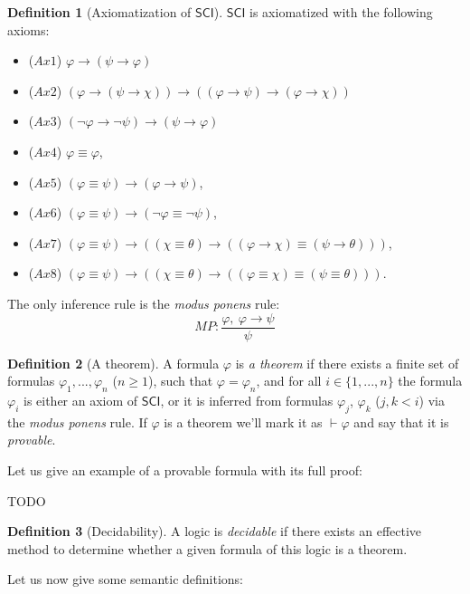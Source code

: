 \documentclass{article}
\theoremstyle{definition}
\newtheorem{definition}{Definition}[section]
\newcommand*{\id}{\equiv}
\newcommand*{\ra}{\rightarrow}
\newcommand{\SCI}{$\mathsf{SCI}$\xspace}
\begin{document}
\begin{definition}[Axiomatization of \SCI]
    \SCI is axiomatized with the following axioms:
    \begin{itemize}
        \item ($Ax1$) $\varphi \ra (\psi \ra \varphi)$
        \item ($Ax2$) $(\varphi \ra (\psi \ra \chi)) \ra ((\varphi \ra \psi) \ra (\varphi \ra \chi))$
        \item ($Ax3$) $(\lnot \varphi \ra \lnot \psi) \ra (\psi \ra \varphi)$
        \item ($Ax4$) $\varphi \id \varphi$,
        \item ($Ax5$) $(\varphi \id \psi) \ra (\varphi \ra \psi)$,
        \item ($Ax6$) $(\varphi \id \psi) \ra (\lnot \varphi \id \lnot \psi)$,
        \item ($Ax7$) $(\varphi \id \psi) \ra ((\chi \id \theta) \ra ((\varphi \ra \chi) \id (\psi \ra \theta)))$,
        \item ($Ax8$) $(\varphi \id \psi) \ra ((\chi \id \theta) \ra ((\varphi \id \chi) \id (\psi \id \theta)))$.
    \end{itemize}
    The only inference rule is the \emph{modus ponens} rule:
    $$
        MP: \frac{
            \varphi, \ \varphi \ra \psi}%
        { \psi }
    $$
\end{definition}

\begin{definition}[A theorem]
    A formula $\varphi$ is \emph{a theorem} if there exists a finite set of formulas $\varphi_1, ..., \varphi_n$ ($n \geq 1$), such that $\varphi = \varphi_n$, and for all $i \in \{1, ..., n\}$ the formula $\varphi_i$ is either an axiom of \SCI, or it is inferred from formulas $\varphi_j$, $\varphi_k$ ($j, k <i$) via the \emph{modus ponens} rule. If $\varphi$ is a theorem we'll mark it as $\vdash \varphi$ and say that it is \emph{provable}.
\end{definition}
Let us give an example of a provable formula with its full proof:

TODO

\begin{definition}[Decidability]
    A logic is \emph{decidable} if there exists an effective method to determine whether a given formula of this logic is a theorem.
\end{definition}

Let us now give some semantic definitions:
\end{document}
